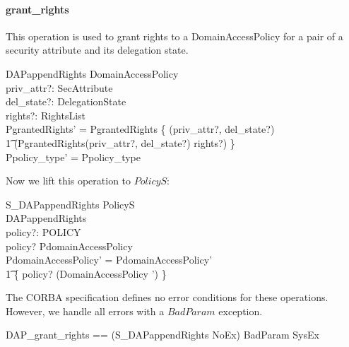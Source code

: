 \paragraph{grant\_rights}
This operation is used to grant rights to a DomainAccessPolicy for a pair of a
security attribute and its delegation state.
\begin{schema}{DAPappendRights}
  \Delta DomainAccessPolicy \\
  priv\_attr?: SecAttribute \\
  del\_state?: DelegationState \\
  rights?: RightsList \\
  \where
  PgrantedRights' = PgrantedRights \oplus \{ (priv\_attr?, del\_state?) \mapsto \\
  \t1 (PgrantedRights(priv\_attr?, del\_state?) \cup \ran rights?) \} \\
  Ppolicy\_type' = Ppolicy\_type \\
\end{schema}
Now we lift this operation to $PolicyS$:
\begin{schema}{S\_DAPappendRights}
  \Delta PolicyS \\
  DAPappendRights \\
  policy?: POLICY \\
  \where  
  policy? \in \dom PdomainAccessPolicy \\
  PdomainAccessPolicy' = PdomainAccessPolicy' \oplus \\
  \t1 \{ policy? \mapsto (\theta DomainAccessPolicy ') \}\\ 
\end{schema}
The CORBA specification defines no error conditions for these operations.
However, we handle all errors with a $BadParam$ exception.
\begin{zed}
  DAP\_grant\_rights == (S\_DAPappendRights \land NoEx) \lor BadParam \lor
  SysEx \\ 
\end{zed}

